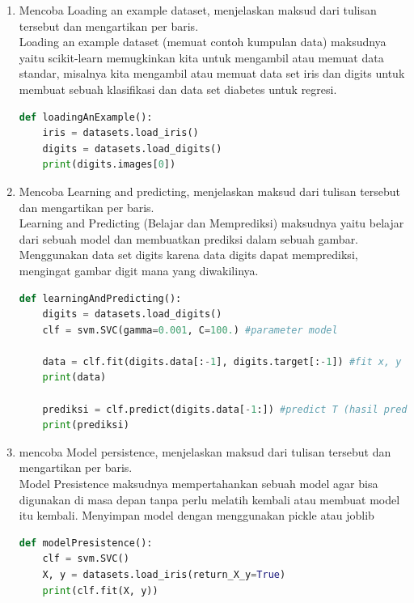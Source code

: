 \begin{enumerate}

\item
Mencoba Loading an example dataset, menjelaskan maksud dari tulisan tersebut dan mengartikan per baris.\\

Loading an example dataset (memuat contoh kumpulan data) maksudnya yaitu scikit-learn memugkinkan kita untuk mengambil atau memuat data standar, misalnya kita mengambil atau memuat data set iris dan digits untuk membuat sebuah klasifikasi dan data set diabetes untuk regresi.\\

\begin{lstlisting}[language=Python]
def loadingAnExample():
    iris = datasets.load_iris()
    digits = datasets.load_digits()
    print(digits.images[0])
\end{lstlisting}

\item
Mencoba Learning and predicting, menjelaskan maksud dari tulisan tersebut dan mengartikan per baris.\\

Learning and Predicting (Belajar dan Memprediksi) maksudnya yaitu belajar dari sebuah model dan membuatkan prediksi dalam sebuah gambar. Menggunakan data set digits karena data digits dapat memprediksi, mengingat gambar digit mana yang diwakilinya. \\

\begin{lstlisting}[language=Python]
def learningAndPredicting():
    digits = datasets.load_digits()
    clf = svm.SVC(gamma=0.001, C=100.) #parameter model

    data = clf.fit(digits.data[:-1], digits.target[:-1]) #fit x, y
    print(data)

    prediksi = clf.predict(digits.data[-1:]) #predict T (hasil prediksi data baru)
    print(prediksi)
\end{lstlisting}

\item
mencoba Model persistence, menjelaskan maksud dari tulisan tersebut dan mengartikan per baris.\\
Model Presistence maksudnya mempertahankan sebuah model agar bisa digunakan di masa depan tanpa perlu melatih kembali atau membuat model itu kembali. Menyimpan model dengan menggunakan pickle atau joblib

\begin{lstlisting}[language=Python]
def modelPresistence():
    clf = svm.SVC()
    X, y = datasets.load_iris(return_X_y=True)
    print(clf.fit(X, y))


\end{lstlisting}
\end{enumerate}
